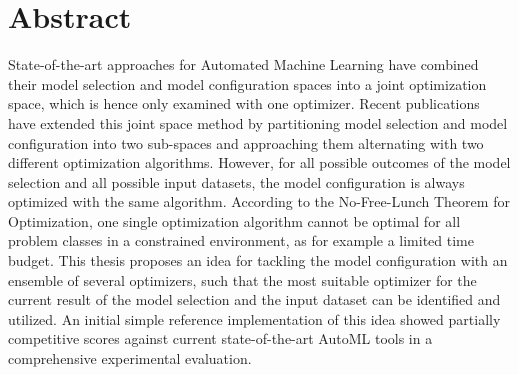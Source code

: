 %
\chapter*{Abstract}
\label{sec:abstract}
\vspace*{-15mm}

State-of-the-art approaches for Automated Machine Learning have combined their model selection and model configuration spaces into a joint optimization space, which is hence only examined with one optimizer.
Recent publications have extended this joint space method by partitioning model selection and model configuration into two sub-spaces and approaching them alternating with two different optimization algorithms.
However, for all possible outcomes of the model selection and all possible input datasets, the model configuration is always optimized with the same algorithm.
According to the No-Free-Lunch Theorem for Optimization, one single optimization algorithm cannot be optimal for all problem classes in a constrained environment, as for example a limited time budget.
This thesis proposes an idea for tackling the model configuration with an ensemble of several optimizers, such that the most suitable optimizer for the current result of the model selection and the input dataset can be identified and utilized.
An initial simple reference implementation of this idea showed partially competitive scores against current state-of-the-art AutoML tools in a comprehensive experimental evaluation.
\vspace*{10mm}

